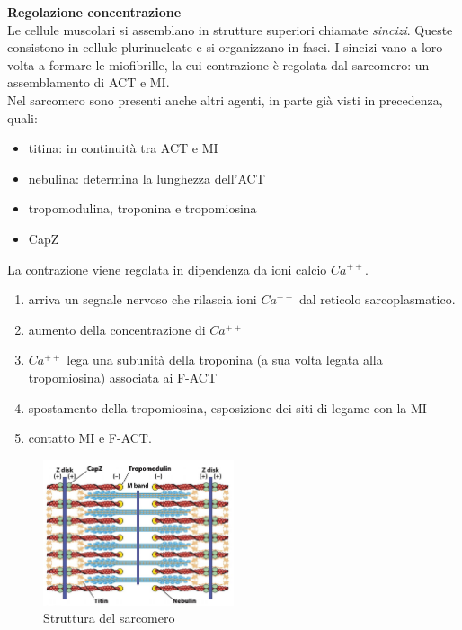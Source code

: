             \textbf{Regolazione concentrazione}\\
                Le cellule muscolari si assemblano in strutture superiori chiamate \textit{sincizi}. Queste consistono in cellule plurinucleate e si organizzano in fasci. I sincizi vano a loro volta a formare le miofibrille, la cui contrazione è regolata dal sarcomero: un assemblamento di ACT e MI. \\
                Nel sarcomero sono presenti anche altri agenti, in parte già visti in precedenza, quali:
                \begin{itemize}
                    \item titina: in continuità tra ACT e MI
                    \item nebulina: determina la lunghezza dell'ACT
                    \item tropomodulina, troponina e tropomiosina
                    \item CapZ
                \end{itemize}
                La contrazione viene regolata in dipendenza da ioni calcio $Ca^{++}$.
                \begin{enumerate}
                    \item arriva un segnale nervoso che rilascia ioni $Ca^{++}$ dal reticolo sarcoplasmatico. 
                    \item aumento della concentrazione di $Ca^{++}$
                    \item $Ca^{++}$ lega una subunità della troponina (a sua volta legata alla tropomiosina) associata ai F-ACT
                    \item spostamento della tropomiosina, esposizione dei siti di legame con la MI
                    \item contatto MI e F-ACT.
                \end{enumerate}
                
                \begin{figure}[h]
                    \centering
                    \includegraphics[width=0.5\textwidth]{images/sarcomero.JPG}
                    \caption{\small Struttura del sarcomero}
                    \label{fig:mesh1}
                \end{figure}
                
